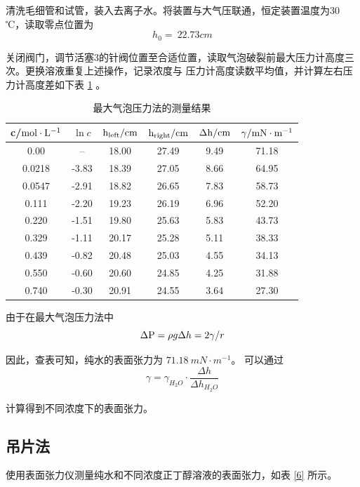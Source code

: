 \documentclass[cn,hazy,pku,12pt,normal,math=newtx,cite=super]{elegantnote}
\begin{document}
    清洗毛细管和试管，装入去离子水。将装置与大气压联通，恒定装置温度为30 ℃，读取零点位置为
$$
    h_0 =\ 22.73 cm 
$$

关闭阀门，调节活塞3的针阀位置至合适位置，读取气泡破裂前最大压力计高度三次。更换溶液重复上述操作，记录浓度与
压力计高度读数平均值，并计算左右压力计高度差如下表 \ref{5} 。

\begin{table}[h]
    \centering
    \caption{最大气泡压力法的测量结果}
    \label{5}
    \begin{tabular}{cccccc}
    \hline
    c/$\rm   mol \cdot L^{-1}$ & $\ln c$ & $\rm h_{left} / cm$ & $\rm h_{right} / cm$ & $\rm \Delta h / cm$ & $\gamma / {\rm mN \cdot m^{-1}}$ \\ \hline
    0.00   &   --  & 18.00 & 27.49 & 9.49 & 71.18 \\
    0.0218 & -3.83 & 18.39 & 27.05 & 8.66 & 64.95 \\
    0.0547 & -2.91 & 18.82 & 26.65 & 7.83 & 58.73 \\
    0.111  & -2.20 & 19.23 & 26.19 & 6.96 & 52.20 \\
    0.220  & -1.51 & 19.80 & 25.63 & 5.83 & 43.73 \\
    0.329  & -1.11 & 20.17 & 25.28 & 5.11 & 38.33 \\
    0.439  & -0.82 & 20.48 & 25.03 & 4.55 & 34.13 \\
    0.550  & -0.60 & 20.60 & 24.85 & 4.25 & 31.88 \\
    0.740  & -0.30 & 20.91 & 24.55 & 3.64 & 27.30 \\ \hline
    \end{tabular}
\end{table}


由于在最大气泡压力法中
$$
    \Delta {\rm P} = \rho g \Delta h = 2 \gamma / r
$$

因此，查表可知，纯水的表面张力为 $ 71.18\ mN \cdot m^{-1}$。 可以通过
$$
    \gamma = \gamma_{H_2O} \cdot \frac{\Delta h}{\Delta h_{H_2O}}
$$

计算得到不同浓度下的表面张力。

\subsection{吊片法}

使用表面张力仪测量纯水和不同浓度正丁醇溶液的表面张力，如表 \ref{6} 所示。
\end{document}
